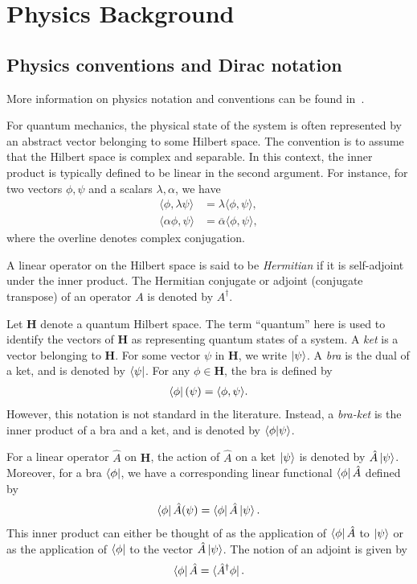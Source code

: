\chapter{Physics Background}\label{ch:physics_background}

\section{Physics conventions and Dirac notation}\label{sec:basics}

More information on physics notation and conventions can be found in~\cite{Hall2013,Griffiths2018,Tung1985}.

For quantum mechanics, the physical state of the system is often represented by an abstract vector belonging to some Hilbert space. The convention is to assume that the Hilbert space is complex and separable. In this context, the inner product is typically defined to be linear in the second argument. For instance, for two vectors $\phi,\psi$ and a scalars $\lambda,\alpha$, we have
\begin{align*}
    \langle \phi,\lambda\psi\rangle&=\lambda\langle \phi,\psi\rangle, \\
    \langle \alpha\phi,\psi\rangle&=\overline{\alpha}\langle \phi,\psi\rangle,
\end{align*}
where the overline denotes complex conjugation.

A linear operator on the Hilbert space is said to be \textit{Hermitian} if it is self-adjoint under the inner product. The Hermitian conjugate or adjoint (conjugate transpose) of an operator $A$ is denoted by $A^\dagger$.

Let $\mathbf{H}$ denote a quantum Hilbert space. The term ``quantum'' here is used to identify the vectors of $\mathbf{H}$ as representing quantum states of a system. A \textit{ket} is a vector belonging to $\mathbf{H}$. For some vector $\psi$ in $\mathbf{H}$, we write $\ket{\psi}$. A \textit{bra} is the dual of a ket, and is denoted by $\bra{\psi}$. For any $\phi\in \mathbf{H}$, the bra is defined by
\begin{align*}
    \bra{\phi}(\psi) = \langle \phi,\psi\rangle.
\end{align*}
However, this notation is not standard in the literature. Instead, a \textit{bra-ket} is the inner product of a bra and a ket, and is denoted by $\braket{\phi|\psi}$.

For a linear operator $\hat{A}$ on $\mathbf{H}$, the action of $\hat{A}$ on a ket $\ket{\psi}$ is denoted by $\hat{A}\ket{\psi}$. Moreover, for a bra $\bra{\phi}$, we have a corresponding linear functional $\bra{\phi}\hat{A}$ defined by
\begin{align*}
    \bra{\phi}\hat{A}(\psi) = \bra{\phi}\hat{A}\ket{\psi}.
\end{align*}
This inner product can either be thought of as the application of $\bra{\phi}\hat{A}$ to $\ket{\psi}$ or as the application of $\bra{\phi}$ to the vector $\hat{A}\ket{\psi}$. The notion of an adjoint is given by
\begin{align*}
    \bra{\phi}\hat{A} = \bra{\hat{A}^\dagger\phi}.
\end{align*}


